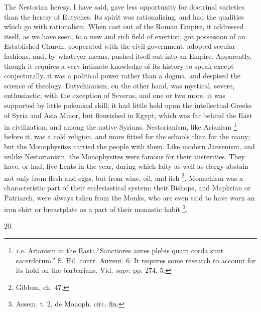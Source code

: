 The Nestorian heresy, I have said, gave less opportunity for
doctrinal varieties than the heresy of Eutyches. Its spirit was
rationalizing, and had the qualities which go with rationalism. When
cast out of the Roman Empire, it addressed itself, as we have seen, to
a new and rich field of exertion, got possession of an Established
Church, cooperated with the civil government, adopted secular
fashions, and, by whatever means, pushed itself out into an Empire.
Apparently, though it requires a very intimate knowledge of its
history to speak except conjecturally, it was a political power rather
than a dogma, and despised the science of theology. Eutychianism, on
the other hand, was mystical, severe, enthusiastic; with the exception
of Severus, and one or two more, it was supported by little polemical
skill; it had little hold upon the intellectual Greeks of Syria and
Asia Minor, but flourished in Egypt, which was far behind the East in
civilization, and among the native Syrians. Nestorianism, like
Arianism \footnote{\emph{i.e}. Arianism in the East: ``Sanctiores
aures plebis quam corda sunt sacerdotum.'' S. Hil. contr. Auxent.
6. It requires some research to account for its hold on the
barbarians. Vid. \emph{supr}. pp. 274, 5.} before it,
was a cold religion, and more fitted for the schools than for the
many; but the Monophysites carried the people with them. Like modern
Jansenism, and unlike Nestorianism, the Monophysites were famous for
their austerities. They have, or had, five Lents in the year, during
which laity as well as clergy abstain not only from flesh and eggs,
but from wine, oil, and fish \footnote{Gibbon, ch. 47.}. Monachism was a characteristic part of their ecclesiastical
system: their Bishops, and Maphrian or Patriarch, were always taken
from the Monks, who are even said to have worn an iron shirt or
breastplate as a part of their monastic habit \footnote{Assem. t. 2, de Monoph. circ. fin.}.

20.

